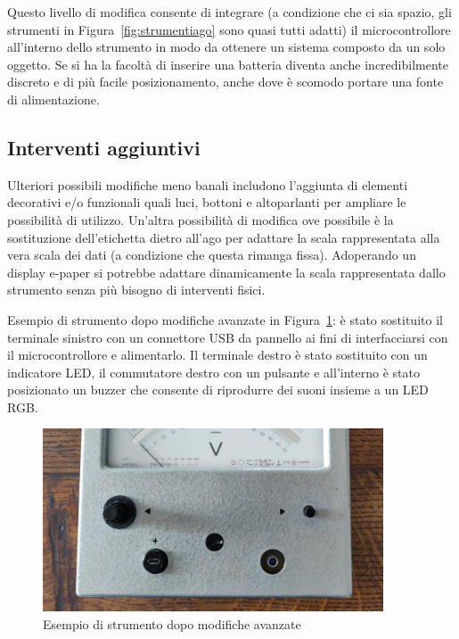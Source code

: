 \documentclass[12pt,a4paper]{report}
\begin{document}
Questo livello di modifica consente di integrare (a condizione che ci sia spazio, gli strumenti in Figura~\ref{fig:strumentiago} sono
quasi tutti adatti) il microcontrollore all'interno dello strumento in modo da ottenere un sistema composto da un solo oggetto.
Se si ha la facoltà di inserire una batteria diventa anche incredibilmente discreto e di più facile posizionamento, anche dove è
scomodo portare una fonte di alimentazione.


\subsection{Interventi aggiuntivi}
Ulteriori possibili modifiche meno banali includono l'aggiunta di elementi decorativi e/o funzionali quali luci, bottoni e altoparlanti
per ampliare le possibilità di utilizzo. Un'altra possibilità di modifica ove possibile è la sostituzione dell'etichetta dietro all'ago per adattare
la scala rappresentata alla vera scala dei dati (a condizione che questa rimanga fissa). Adoperando un display e-paper si potrebbe
adattare dinamicamente la scala rappresentata dallo strumento senza più bisogno di interventi fisici.

Esempio di strumento dopo modifiche avanzate in Figura~\ref{fig:interventocompleto}:
è stato sostituito il terminale sinistro con un connettore USB da pannello ai fini di interfacciarsi con il microcontrollore e alimentarlo.
Il terminale destro è stato sostituito con un indicatore LED, il commutatore
destro con un pulsante e all'interno è stato posizionato un buzzer che consente di riprodurre dei suoni insieme a un LED RGB.




\begin{figure}[h]
  \centering
  \includegraphics[width=0.9\textwidth]{interventocompleto}
  \caption{Esempio di strumento dopo modifiche avanzate}
  \label{fig:interventocompleto}
\end{figure}
\end{document}
